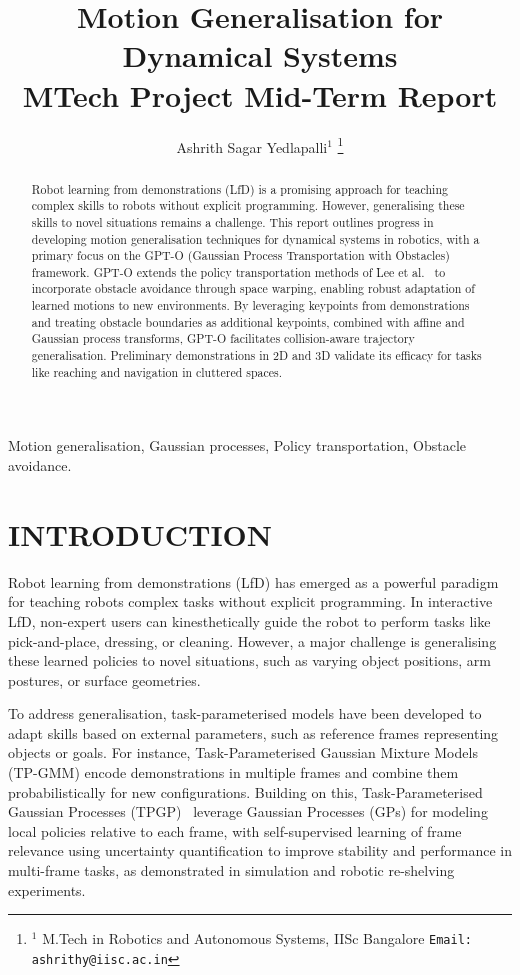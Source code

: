 \documentclass[a4paper, 10pt, conference]{ieeeconf}
\title{
    \LARGE \bf
    Motion Generalisation for Dynamical Systems
    \\ [0.5em]
    \large MTech Project Mid-Term Report
}
\author{
    Ashrith Sagar Yedlapalli$^{1}$
    \thanks{$^{1}$ M.Tech in Robotics and Autonomous Systems, IISc Bangalore
    {\tt\small Email: ashrithy@iisc.ac.in}}
}
\begin{document}
\maketitle
\thispagestyle{empty}
\pagestyle{empty}

\begin{abstract}
    Robot learning from demonstrations (LfD) is a promising approach for teaching complex skills to robots without explicit programming.
    However, generalising these skills to novel situations remains a challenge.
    This report outlines progress in developing motion generalisation techniques for dynamical systems in robotics, with a primary focus on the GPT-O (Gaussian Process Transportation with Obstacles) framework.
    GPT-O extends the policy transportation methods of Lee et al.~\cite{lee2024generalizable} to incorporate obstacle avoidance through space warping, enabling robust adaptation of learned motions to new environments.
    By leveraging keypoints from demonstrations and treating obstacle boundaries as additional keypoints, combined with affine and Gaussian process transforms, GPT-O facilitates collision-aware trajectory generalisation.
    Preliminary demonstrations in 2D and 3D validate its efficacy for tasks like reaching and navigation in cluttered spaces.
\end{abstract}

\begin{keywords}
    Motion generalisation,
    Gaussian processes,
    Policy transportation,
    Obstacle avoidance.
\end{keywords}

\section{INTRODUCTION}

Robot learning from demonstrations (LfD) has emerged as a powerful paradigm for teaching robots complex tasks without explicit programming.
In interactive LfD, non-expert users can kinesthetically guide the robot to perform tasks like pick-and-place, dressing, or cleaning.
However, a major challenge is generalising these learned policies to novel situations, such as varying object positions, arm postures, or surface geometries.

To address generalisation, task-parameterised models have been developed to adapt skills based on external parameters, such as reference frames representing objects or goals.
For instance, Task-Parameterised Gaussian Mixture Models (TP-GMM) encode demonstrations in multiple frames and combine them probabilistically for new configurations.
Building on this, Task-Parameterised Gaussian Processes (TPGP)~\cite{ramirez2024learning} leverage Gaussian Processes (GPs) for modeling local policies relative to each frame, with self-supervised learning of frame relevance using uncertainty quantification to improve stability and performance in multi-frame tasks, as demonstrated in simulation and robotic re-shelving experiments.
\end{document}
